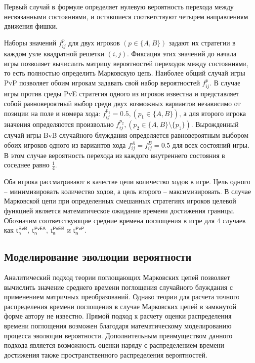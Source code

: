 Первый случай в формуле определяет нулевую вероятность перехода между несвязанными состояниями, и оставшиеся соответствуют четырем направлениям движения фишки.

Наборы значений $f_{ij}^p$ для двух игроков $(p \in \{A, B\})$ задают их стратегии в каждом узле квадратной решетки $(i, j)$. Фиксация этих значений до начала игры позволяет вычислить матрицу вероятностей переходов между состояниями, то есть полностью определить Марковскую цепь. Наиболее общий случай игры PvP позволяет обоим игрокам задавать свой набор вероятностей $f_{ij}^p$. В случае игры против среды PvE стратегия одного из игроков известна и представляет собой равновероятный выбор среди двух возможных вариантов независимо от позиции на поле и номера хода: $f_{ij}^{p_1} = 0.5, (p_1 \in \{A, B\})$, а для второго игрока значения определяются произвольно $f_{ij}^{p_2}, (p_2 \in \{A, B\} \setminus \{p_1\})$. Вырожденный случай игры BvB случайного блуждания определяется равновероятным выбором обоих игроков одного из вариантов хода $f_{ij}^{A} = f_{ij}^{B} = 0.5$ для всех состояний игры. В этом случае вероятность перехода из каждого внутреннего состояния в соседнее равно $\frac{1}{4}$.

Оба игрока рассматривают в качестве цели количество ходов в игре. Цель одного -- минимизировать количество ходов, а цель второго -- максимизировать. В случае Марковской цепи при определенных смешанных стратегиях игроков целевой функцией является математическое ожидание времени достижения границы. Обозначим соответствующие средние времена поглощения в игре для 4 случаев как $\boldsymbol{\mathsf{t_n^{BvB}}}$, $\boldsymbol{\mathsf{t_n^{PvEA}}}$, $\boldsymbol{\mathsf{t_n^{PvEB}}}$ и $\boldsymbol{\mathsf{t_n^{PvP}}}$.

\subsection{Моделирование эволюции вероятности}\label{subsec:ch3/sec2/sub2}

Аналитический подход теории поглощающих Марковских цепей позволяет вычислить значение среднего времени поглощения случайного блуждания с применением матричных преобразований. Однако теории для расчета точного распределения времени поглощения в случае Марковских цепей в замкнутой форме автору не известно. Прямой подход к расчету оценки распределения времени поглощения возможен благодаря математическому моделированию процесса эволюции вероятности. Дополнительным преимуществом данного подхода является возможность оценки наряду с распределением времени достижения также пространственного распределения вероятностей. 

